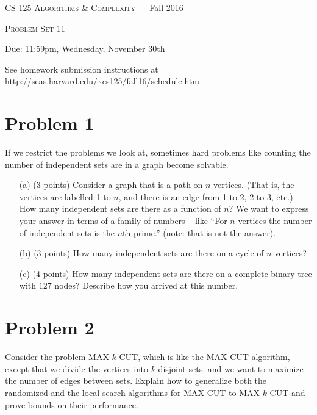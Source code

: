 \documentclass[12pt]{article}
\begin{document}
\thispagestyle{empty}

\begin{center}
{\Large \textsc{CS 125 Algorithms \& Complexity} --- Fall 2016}

\bigskip

{\Large \textsc{Problem Set 11}}

\smallskip

Due: 11:59pm, Wednesday, November 30th

\bigskip

{\footnotesize See homework submission instructions at \url{http://seas.harvard.edu/~cs125/fall16/schedule.htm}}
\end{center}


\section*{Problem 1} 

If we restrict the problems we look at, sometimes hard problems like counting the number of independent sets are in a graph become solvable.

\begin{itemize}
\item[(a)] (3 points) Consider a graph that is a path on $n$ vertices.  (That is, the vertices are labelled 1 to $n$, and there is an edge from 1 to 2, 2 to 3, etc.)  How many independent sets are there as a function of $n$? We want to express your answer in terms of a family of numbers -- like ``For $n$ vertices the number of independent sets is the $n$th prime.'' (note: that is not the answer).
\item[(b)] (3 points) How many independent sets are there on a cycle of $n$ vertices?
\item[(c)] (4 points) How many independent sets are there on a complete binary tree with $127$ nodes? Describe how you arrived at this number.
\end{itemize}

\section*{Problem 2}

Consider the problem MAX-$k$-CUT, which is like the MAX CUT algorithm, except that we divide the vertices into $k$ disjoint sets, and we want to maximize the number of edges between sets.  Explain how to generalize both the randomized and the local search algorithms for MAX CUT to MAX-$k$-CUT and prove bounds on their performance.
\end{document}
